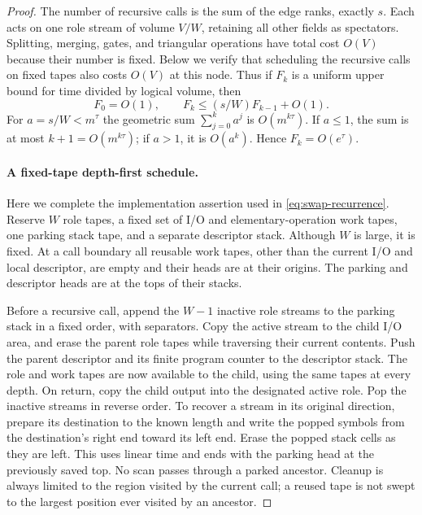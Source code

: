 \documentclass[11pt]{article}
\theoremstyle{definition}
\begin{document}
\begin{proof}
The number of recursive calls is the sum of the edge ranks, exactly $s$.
Each acts on one role stream of volume $V/W$, retaining all other
fields as spectators.  Splitting,
merging, gates, and triangular operations have total cost $O(V)$ because
their number is fixed.  Below we verify that scheduling the recursive
calls on fixed tapes also costs $O(V)$ at this node.  Thus if $F_k$ is a
uniform upper bound for time divided by logical volume, then
\begin{equation}
\label{eq:swap-recurrence}
 F_0=O(1),\qquad F_k\le(s/W)F_{k-1}+O(1).
\end{equation}
For $a=s/W<m^\tau$ the geometric sum
$\sum_{j=0}^k a^j$ is $O(m^{k\tau})$.  If $a\le1$, the sum is at
most $k+1=O(m^{k\tau})$; if $a>1$, it is $O(a^k)$.
Hence $F_k=O(e^\tau)$.

\paragraph{A fixed-tape depth-first schedule.}
Here we complete the implementation assertion used in
\eqref{eq:swap-recurrence}.  Reserve $W$ role tapes, a fixed set of
I/O and elementary-operation work tapes, one parking stack tape, and a
separate descriptor stack.  Although $W$ is large, it is fixed.
At a call boundary all reusable work tapes, other than the current I/O
and local descriptor, are empty and their heads are at their origins.
The parking and descriptor heads are at the tops of their stacks.

Before a recursive call, append the $W-1$ inactive role streams to the
parking stack in a fixed order, with separators.  Copy the active stream
to the child I/O area, and erase the parent role tapes while traversing
their current contents.  Push the parent descriptor and its finite
program counter to the descriptor stack.  The role and work tapes are
now available to the child, using the same tapes at every depth.
On return, copy the child output into the designated active role.
Pop the inactive streams in reverse order.  To recover a stream in its
original direction, prepare its destination to the known length and
write the popped symbols from the destination's right end toward its
left end.  Erase the popped stack cells as they are left.  This uses
linear time and ends with the parking head at the previously saved top.
No scan passes through a parked ancestor.  Cleanup is always limited to
the region visited by the current call; a reused tape is not swept to
the largest position ever visited by an ancestor.


\end{proof}
\end{document}
